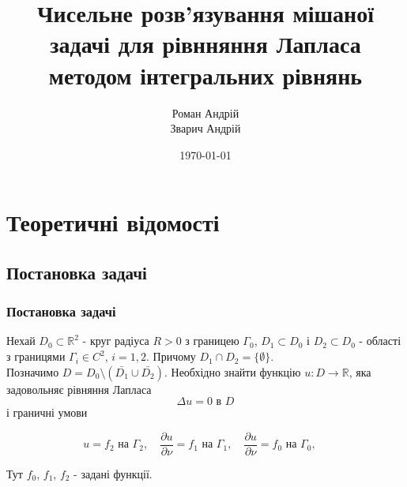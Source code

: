 \documentclass[10pt]{beamer}
\begin{document}
\title[]{Чисельне розв'язування мішаної задачі для рівнняння Лапласа методом інтегральних рівнянь}
\author{{Роман Андрій}\\ {Зварич Андрій}}
\date{\today}

\begin{frame}
\titlepage
\end{frame}

\begin{frame}
\tableofcontents
\end{frame}

\section{Теоретичні відомості}
\subsection{Постановка задачі}
\begin{frame}
\frametitle{Постановка задачі}
\hspace*{\parindent}Нехай $D_0\subset \mathbb{R}^2$ - круг радіуса $R>0$ з границею $\Gamma_0$, $D_1\subset D_0$ і $D_2\subset D_0$ - області з границями $\Gamma_i\in C^2$, $i=1,2$. Причому $D_1\cap D_2=\{\emptyset\}$.\\ 
\hspace*{\parindent}Позначимо $D=D_0\setminus (\bar{D_1}\cup\bar{D_2})$. Необхідно знайти функцію $u:D \rightarrow \mathbb{R}$, яка задовольняє рівняння Лапласа
\begin{equation}
\Delta u=0\text{ в }D
\end{equation}
і граничні умови 

\begin{equation}
		u = f_2 \mbox{  на  }  \Gamma_2 ,\quad
		\frac{\partial u}{\partial \nu} = f_1 \mbox{  на  }  \Gamma_1 ,\quad
		\frac{\partial u}{\partial \nu} = f_0 \mbox{  на  } \Gamma_0 ,\quad
\end{equation}

Тут $f_0$, $f_1$, $f_2$ - задані функції.
\end{frame}
\end{document}
